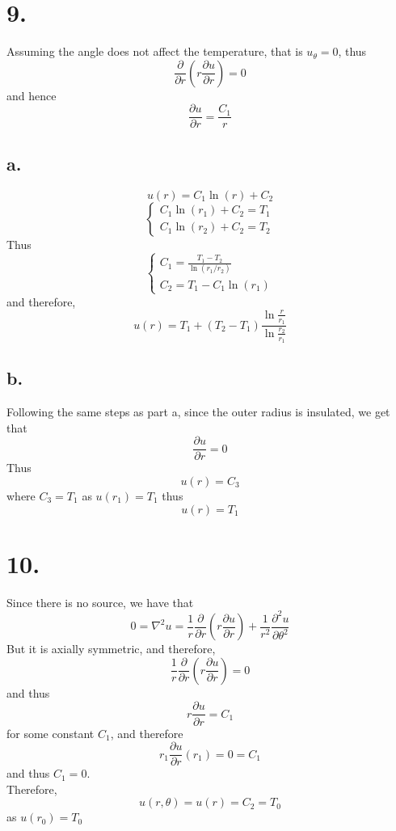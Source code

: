 \documentclass[11pt]{article}
\theoremstyle{mystyle}
\theoremstyle{definition}
\begin{document}
\section*{9.}
Assuming the angle does not affect the temperature, that is $u_{\theta} = 0 $, thus 
\[
  \frac{\partial}{\partial r} \left(r \frac{\partial u}{\partial r}\right) = 0
\]
and hence 
\[
  \frac{\partial u}{\partial r} = \frac{C_1}{r} 
\]
\subsection*{a.}
\[
  u(r) = C_1 \ln(r) + C_2
\]
\[
  \begin{cases}
    C_1 \ln(r_1) + C_2 = T_1 \\
    C_1 \ln(r_2) + C_2 = T_2 
  \end{cases}
\]
Thus 
\[
  \begin{cases}
    C_1 = \frac{T_1 - T_2}{\ln(r_1/r_2)} \\
    C_2 = T_1 - C_1 \ln(r_1)
  \end{cases}
\]
and therefore, 
\[
  u(r) = T_1 + (T_2 - T_1) \displaystyle\frac{\ln \displaystyle\frac{r}{r_1}}{\ln \displaystyle\frac{r_2}{r_1}} 
\]
\subsection*{b.}
Following the same steps as part a, since the outer radius is insulated, we get that 
\[
  \displaystyle\frac{\partial u}{\partial r} = 0
\]
Thus 
\[
  u(r) = C_3 
\]
where $C_3 =T_1$ as $u(r_1) = T_1$ thus 
\[
  u(r) = T_1
\]
\newpage
\section*{10.}
Since there is no source, we have that 
\[
  0 = \nabla^2 u = \frac{1}{r} \frac{\partial}{\partial r} \left( r \frac{\partial u}{\partial r} \right) + \frac{1}{r^2} \frac{\partial^2 u}{\partial \theta^2}
\]
But it is axially symmetric, and therefore, 
\[
  \frac{1}{r} \frac{\partial}{\partial r} \left( r \frac{\partial u}{\partial r} \right) = 0
\]
and thus
\[
  r \displaystyle\frac{\partial u}{\partial r} = C_1
\]
for some constant $C_1$, and therefore
\[
  r_1 \displaystyle\frac{\partial u}{\partial r}(r_1) = 0 = C_1
\]
and thus $C_1 = 0$. \\
Therefore, 
\[
  u(r, \theta) = u(r) = C_2 = T_0
\]
as $u(r_0) = T_0$
\end{document}

